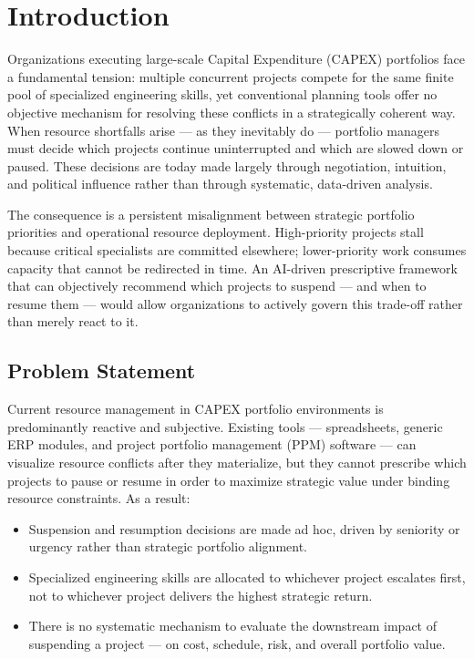 \chapter{Introduction}
\label{chap:introduction}

Organizations executing large-scale Capital Expenditure (CAPEX) portfolios face a fundamental
tension: multiple concurrent projects compete for the same finite pool of specialized engineering
skills, yet conventional planning tools offer no objective mechanism for resolving these conflicts
in a strategically coherent way. When resource shortfalls arise — as they inevitably do — portfolio
managers must decide which projects continue uninterrupted and which are slowed down or paused.
These decisions are today made largely through negotiation, intuition, and political influence
rather than through systematic, data-driven analysis.

The consequence is a persistent misalignment between strategic portfolio priorities and operational
resource deployment. High-priority projects stall because critical specialists are committed
elsewhere; lower-priority work consumes capacity that cannot be redirected in time. An AI-driven
prescriptive framework that can objectively recommend which projects to suspend — and when to
resume them — would allow organizations to actively govern this trade-off rather than merely react
to it.

\section{Problem Statement}
\label{sec:problem_statement}

Current resource management in CAPEX portfolio environments is predominantly reactive and
subjective. Existing tools — spreadsheets, generic ERP modules, and project portfolio management
(PPM) software — can visualize resource conflicts after they materialize, but they cannot
prescribe which projects to pause or resume in order to maximize strategic value under binding
resource constraints. As a result:

\begin{itemize}
  \item Suspension and resumption decisions are made ad hoc, driven by seniority or urgency
        rather than strategic portfolio alignment.
  \item Specialized engineering skills are allocated to whichever project escalates first,
        not to whichever project delivers the highest strategic return.
  \item There is no systematic mechanism to evaluate the downstream impact of suspending a
        project — on cost, schedule, risk, and overall portfolio value.
\end{itemize}

